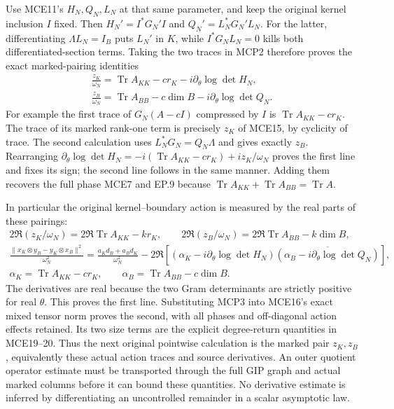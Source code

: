 \documentclass[11pt,a4paper]{article}
\begin{document}
Use MCE11's $H_N,Q_N,L_N$ at that same parameter, and keep the
original kernel inclusion $I$ fixed. Then
$H_N'=I^*G_N'I$ and $Q_N'=L_N^*G_N'L_N$.
For the latter, differentiating $\Lambda L_N=I_B$ puts $L_N'$
in $K$, while $I^*G_NL_N=0$ kills both differentiated-section
terms. Taking the two traces in MCP2 therefore proves the exact
marked-pairing identities
\[
 \begin{gathered}
 \frac{z_K}{\omega_N}
   =\operatorname{Tr}A_{KK}-cr_K
                    -i\partial_\theta\log\det H_N,\\
 \frac{z_B}{\omega_N}
   =\operatorname{Tr}A_{BB}-c\dim B
                    -i\partial_\theta\log\det Q_N.
 \end{gathered}\tag{MCP3}
\]
For example the first trace of $G_N(A-cI)$ compressed by $I$
is $\operatorname{Tr}A_{KK}-cr_K$. The trace of its marked
rank-one term is precisely $z_K$ of MCE15, by cyclicity of trace.
The second calculation uses $L_N^*G_N=Q_N\Lambda$ and gives
exactly $z_B$. Rearranging
$\partial_\theta\log\det H_N=-i(\operatorname{Tr}A_{KK}-cr_K)
+iz_K/\omega_N$ proves the first line and fixes its sign;
the second line follows in the same manner. Adding them recovers
the full phase MCE7 and EP.9 because
$\operatorname{Tr}A_{KK}+\operatorname{Tr}A_{BB}=\operatorname{Tr}A$.

In particular the original kernel--boundary action is measured by
the real parts of these pairings:
\[
 \begin{gathered}
 2\Re(z_K/\omega_N)=2\Re\operatorname{Tr}A_{KK}-kr_K,\qquad
 2\Re(z_B/\omega_N)=2\Re\operatorname{Tr}A_{BB}-k\dim B,\\
 \frac{\|x_K\otimes y_B-y_K\otimes x_B\|^2}{\omega_N^2}
  =\frac{a_Kd_B+a_Bd_K}{\omega_N^2}
       -2\Re\left[
       (\alpha_K-i\partial_\theta\log\det H_N)
       \overline{(\alpha_B-i\partial_\theta\log\det Q_N)}\right],\\
 \alpha_K=\operatorname{Tr}A_{KK}-cr_K,\qquad
 \alpha_B=\operatorname{Tr}A_{BB}-c\dim B.
 \end{gathered}\tag{MCP4}
\]
The derivatives are real because the two Gram determinants are
strictly positive for real $\theta$. This proves the first line.
Substituting MCP3 into MCE16's exact mixed tensor norm proves the
second, with all phases and off-diagonal action effects retained.
Its two size terms are the explicit degree-return quantities in
MCE19--20. Thus the next original pointwise calculation is the
marked pair $z_K,z_B$, equivalently these actual action traces
and source derivatives. An outer quotient operator estimate must
be transported through the full GIP graph and actual marked
columns before it can bound these quantities. No derivative
estimate is inferred by differentiating an uncontrolled remainder
in a scalar asymptotic law.
\end{document}
